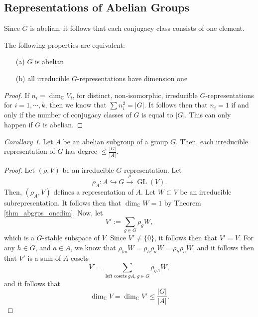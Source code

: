 \documentclass[a4paper]{report}
\theoremstyle{definition}
\theoremstyle{remark}
\theoremstyle{proposition}
\theoremstyle{conjecture}
\theoremstyle{lemma}
\theoremstyle{corollary}
\newtheorem{corollary}{Corollary}
\theoremstyle{exercise}
\theoremstyle{example}
\newcommand{\C}{\mathbb{C}}
\newcommand{\on}{\operatorname}
\begin{document}
\subsection{Representations of Abelian Groups}

Since $G$ is abelian, it follows that each conjugacy class consists of one 
element. 

\begin{theorem}\label{thm_abgrps_onedim}
    The following properties are equivalent:
    \begin{itemize}
        \item[(a)] $G$ is abelian 
        \item[(b)] all irreducible $G$-representations have dimension one
    \end{itemize}
\end{theorem}

\begin{proof}
    If $n_i = \dim_\C V_i$, for distinct, non-isomorphic, irreducible 
    $G$-representations for $i=1,\cdots,k$, then we know that 
    $\sum n_i^2 = \vert G\vert$. It follows then that $n_i = 1$ if and only 
    if the number of conjugacy classes of $G$ is equal to $\vert G \vert$.
    This can only happen if $G$ is abelian.
\end{proof}

\begin{corollary}
    Let $A$ be an abelian subgroup of a group $G$. Then, each irreducible 
    representation of $G$ has degree $\leq \frac{\vert G\vert}{\vert A \vert}$.
\end{corollary}

\begin{proof}
    Let $(\rho,V)$ be an irreducible $G$-representation. Let 
    $$\rho_A : A \hookrightarrow G \stackrel{\rho}{\longrightarrow} \on{GL}(V).$$
    Then, $(\rho_A,V)$ defines a representation of $A$. Let $W\subset V$ 
    be an irreducible subrepresentation. It follows then that $\dim_\C W =1$
    by Theorem \ref{thm_abgrps_onedim}. Now, let 
    $$V' := \sum_{g\in G}\rho_gW,$$
    which is a $G$-stable subspace of $V$. Since $V' \neq \lbrace 0\rbrace$,
    it follows then that $V' = V$. For any $h\in G$, and $a \in A$, 
    we know that $\rho_{ha}W = \rho_h\rho_aW = \rho_h\rho_a W$,
    and it follows then that $V'$ is a sum of $A$-cosets 
    $$V' = \sum_{\text{left cosets $gA$, $g\in G$}}\rho_{gA} W,$$
    and it follows that $$\dim_\C V = \dim_\C V' \leq \frac{\vert G\vert}{\vert A \vert}.$$
\end{proof}
\end{document}
